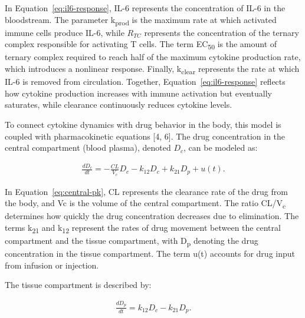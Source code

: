\documentclass[11pt]{article}
\begin{document}
In Equation~\ref{eq:il6-response}, IL-6 represents the concentration of IL-6 in the bloodstream. The parameter k\textsubscript{prod} is the maximum rate at which activated immune cells produce IL-6, while $R_{TC}$ represents the concentration of the ternary complex responsible for activating T cells. The term EC\textsubscript{50} is the amount of ternary complex required to reach half of the maximum cytokine production rate, which introduces a nonlinear response. Finally, k\textsubscript{clear} represents the rate at which IL-6 is removed from circulation. Together, Equation~\ref{eq:il6-response} reflects how cytokine production increases with immune activation but eventually saturates, while clearance continuously reduces cytokine levels.
\par\medskip

To connect cytokine dynamics with drug behavior in the body, this model is coupled with pharmacokinetic equations [4, 6]. The drug concentration in the central compartment (blood plasma), denoted $D_c$, can be modeled as:
\par\medskip

\begin{equation}
\begin{aligned}
\frac{dD_c}{dt}=-\frac{CL}{V_c}D_c-k_{12}D_c+k_{21}D_p+u(t).
\end{aligned}
\label{eq:central-pk}
\end{equation}

In Equation~\ref{eq:central-pk}, CL represents the clearance rate of the drug from the body, and Vc is the volume of the central compartment. The ratio CL/V\textsubscript{c  }determines how quickly the drug concentration decreases due to elimination. The terms k\textsubscript{21  }and k\textsubscript{12  }represent the rates of drug movement between the central compartment and the tissue compartment, with D\textsubscript{p} denoting the drug concentration in the tissue compartment. The term u(t) accounts for drug input from infusion or injection.
\par\medskip

The tissue compartment is described by:
\par\medskip

\begin{equation}
\begin{aligned}
\frac{dD_p}{dt}=k_{12}D_c-k_{21}D_p.
\end{aligned}
\label{eq:peripheral-pk}
\end{equation}
\end{document}
